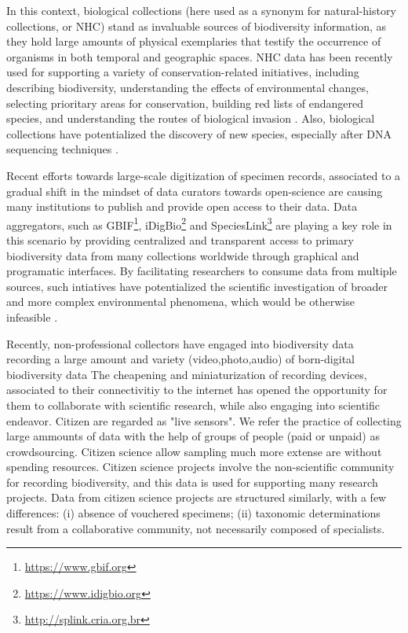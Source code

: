 In this context, biological collections (here used as a synonym for natural-history collections, or NHC) stand as invaluable sources of biodiversity information, as they hold large amounts of physical exemplaries that testify the occurrence of organisms in both temporal and geographic spaces.
NHC data has been recently used for supporting a variety of conservation-related initiatives, including describing biodiversity, understanding the effects of environmental changes, selecting prioritary areas for conservation, building red lists of endangered species, and understanding the routes of biological invasion \cite{Nualart2017, kemp2015}. %
Also, biological collections have potentialized the discovery of new species, especially after DNA sequencing techniques \cite{Kemp2015}.

Recent efforts towards large-scale digitization of specimen records, associated to a gradual shift in the mindset of data curators towards open-science are causing many institutions to publish and provide open access to their data.
Data aggregators, such as GBIF\footnote{\url{https://www.gbif.org}}, iDigBio\footnote{\url{https://www.idigbio.org}} and SpeciesLink\footnote{\url{http://splink.cria.org.br}} are playing a key role in this scenario by providing centralized and transparent access to primary biodiversity data from many collections worldwide through graphical and programatic interfaces.
By facilitating researchers to consume data from multiple sources, such intiatives have potentialized the scientific investigation of broader and more complex environmental phenomena, which would be otherwise infeasible \cite{James2018}.

Recently, non-professional collectors have engaged into biodiversity data recording a large amount and variety (video,photo,audio) of born-digital biodiversity data
The cheapening and miniaturization of recording devices, associated to their connectivitiy to the internet has opened the opportunity for them to collaborate with scientific research, while also engaging into scientific endeavor.
Citizen are regarded as "live sensors".
We refer the practice of collecting large ammounts of data with the help of groups of people (paid or unpaid) as crowdsourcing.
Citizen science allow sampling much more extense are without spending resources.
Citizen science projects involve the non-scientific community for recording biodiversity, and this data is used for supporting many research projects.
Data from citizen science projects are structured similarly, with a few differences: (i) absence of vouchered specimens; (ii) taxonomic determinations result from a collaborative community, not necessarily composed of specialists. 

